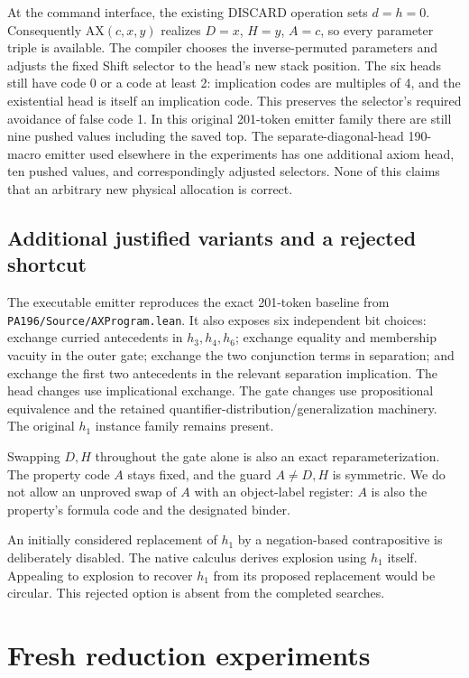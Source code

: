 \documentclass[10pt,letterpaper]{article}
\begin{document}
At the command interface, the existing DISCARD operation sets $d=h=0$.
Consequently AX$(c,x,y)$ realizes $D=x$, $H=y$, $A=c$, so every parameter triple
is available. The compiler chooses the inverse-permuted parameters and adjusts
the fixed Shift selector to the head's new stack position. The six heads still
have code 0 or a code at least 2: implication codes are multiples of 4, and
the existential head is itself an implication code. This preserves the
selector's required avoidance of false code 1. In this original 201-token
emitter family there are still nine pushed values including the saved top.
The separate-diagonal-head 190-macro emitter used elsewhere in the experiments
has one additional axiom head, ten pushed values, and correspondingly adjusted
selectors. None of this claims that an arbitrary new physical allocation is
correct.

\subsection{Additional justified variants and a rejected shortcut}

The executable emitter reproduces the exact 201-token baseline from
\texttt{PA196/Source/AXProgram.lean}. It also exposes six independent bit choices:
exchange curried antecedents in $h_3,h_4,h_6$; exchange equality and membership
vacuity in the outer gate; exchange the two conjunction terms in separation;
and exchange the first two antecedents in the relevant separation implication.
The head changes use implicational exchange. The gate changes use propositional
equivalence and the retained quantifier-distribution/generalization machinery.
The original $h_1$ instance family remains present.

Swapping $D,H$ throughout the gate alone is also an exact reparameterization.
The property code $A$ stays fixed, and the guard $A\ne D,H$ is symmetric. We do
not allow an unproved swap of $A$ with an object-label register: $A$ is also the
property's formula code and the designated binder.

An initially considered replacement of $h_1$ by a negation-based contrapositive
is deliberately disabled. The native calculus derives explosion using $h_1$
itself. Appealing to explosion to recover $h_1$ from its proposed replacement
would be circular. This rejected option is absent from the completed searches.

\section{Fresh reduction experiments}
\end{document}
